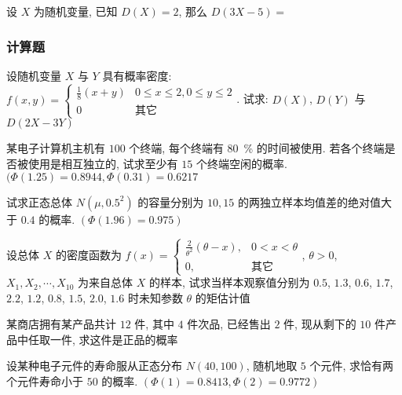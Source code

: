 \begin{ti}
	设 $X$ 为随机变量, 已知 $D(X)=2$, 那么 $D(3X-5)=$ \hua{}
\end{ti}

\subsubsection{计算题}
\begin{ti}[10 分]
	设随机变量 $X$ 与 $Y$ 具有概率密度: $f(x,y)=
	\begin{cases}
	\frac{1}{8}(x+y) & 0\leqslant x\leqslant 2, 0\leqslant y\leqslant 2\\
	0 & \text{其它}
	\end{cases}
	$. 试求: $D(X)$, $D(Y)$ 与 $D(2X-3Y)$
\end{ti}

\begin{ti}[10 分]
	某电子计算机主机有 $100$ 个终端, 每个终端有 \SI{80}{\percent} 的时间被使用. 若各个终端是否被使用是相互独立的, 试求至少有 $15$ 个终端空闲的概率. $(\varPhi(1.25)=0.8944, \varPhi(0.31)=0.6217$
\end{ti}

\begin{ti}[10 分]
	试求正态总体 $N\left(\mu,0.5^2\right)$ 的容量分别为 $10,15$ 的两独立样本均值差的绝对值大于 $0.4$ 的概率. $(\varPhi(1.96)=0.975)$
\end{ti}

\begin{ti}[10 分]
	设总体 $X$ 的密度函数为 $f(x)=
	\begin{cases}
	\frac{2}{\theta^2}(\theta-x), & 0<x<\theta\\
	0, & \text{其它}
	\end{cases}
	$, $\theta>0$, $X_1,X_2,\cdots,X_{10}$ 为来自总体 $X$ 的样本, 试求当样本观察值分别为 $0.5$, $1.3$, $0.6$, $1.7$, $2.2$, $1.2$, $0.8$, $1.5$, $2.0$, $1.6$ 时未知参数 $\theta$ 的矩估计值
\end{ti}

\begin{ti}[10 分]
	某商店拥有某产品共计 $12$ 件, 其中 $4$ 件次品, 已经售出 $2$ 件, 现从剩下的 $10$ 件产品中任取一件, 求这件是正品的概率
\end{ti}

\begin{ti}[10 分]
	设某种电子元件的寿命服从正态分布 $N(40,100)$, 随机地取 $5$ 个元件, 求恰有两个元件寿命小于 $50$ 的概率. $(\varPhi(1)=0.8413, \varPhi(2)=0.9772)$
\end{ti}

